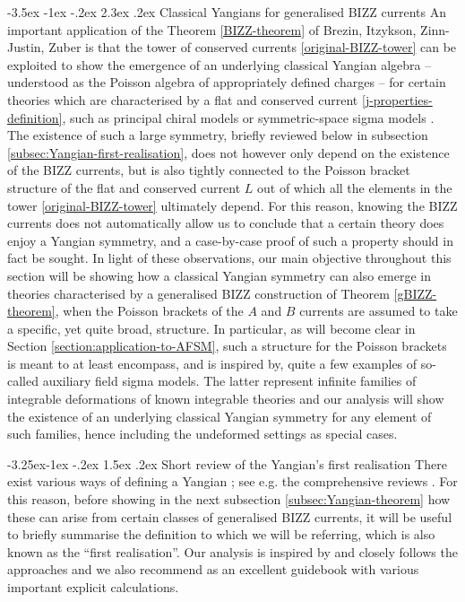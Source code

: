 \documentclass[12pt]{article}
\makeatletter
\renewcommand\section{\@startsection {section}{1}{\z@}%
                                   {-3.5ex \@plus -1ex \@minus -.2ex}%
                                   {2.3ex \@plus.2ex}%
                                   {\normalfont\large\bfseries}}
\renewcommand\subsection{\@startsection{subsection}{2}{\z@}%
                                     {-3.25ex\@plus -1ex \@minus -.2ex}%
                                     {1.5ex \@plus .2ex}%
                                     {\normalfont\bfseries}}
\numberwithin{equation}{section}
\makeatother
\begin{document}
\section{Classical Yangians for generalised BIZZ currents}\label{section:Yangians}
An important application of the Theorem \ref{BIZZ-theorem} of Brezin, Itzykson, Zinn-Justin, Zuber is that the tower of conserved currents \eqref{original-BIZZ-tower} can be exploited to show the emergence of an underlying classical Yangian algebra -- understood as the Poisson algebra of appropriately defined charges -- for certain theories which are characterised by a flat and conserved current \eqref{j-properties-definition}, such as principal chiral models \cite{MacKay:1992he} or symmetric-space sigma models \cite{Klose:2016qfv}. The existence of such a large symmetry, briefly reviewed below in subsection \ref{subsec:Yangian-first-realisation}, does not however only depend on the existence of the BIZZ currents, but is also tightly connected to the Poisson bracket structure of the flat and conserved current $L$ out of which all the elements in the tower \eqref{original-BIZZ-tower} ultimately depend. For this reason, knowing the BIZZ currents does not automatically allow us to conclude that a certain theory does enjoy a Yangian symmetry, and a case-by-case proof of such a property should in fact be sought. In light of these observations, our main objective throughout this section will be showing how a classical Yangian symmetry can also emerge in theories characterised by a generalised BIZZ construction of Theorem \ref{gBIZZ-theorem}, when the Poisson brackets of the $A$ and $B$ currents are assumed to take a specific, yet quite broad, structure. In particular, as will become clear in Section \ref{section:application-to-AFSM}, such a structure for the Poisson brackets is meant to at least encompass, and is inspired by, quite a few examples of so-called auxiliary field sigma models. The latter represent infinite families of integrable deformations of known integrable theories and our analysis will show the existence of an underlying classical Yangian symmetry for any element of such families, hence including the undeformed settings as special cases.



\subsection{Short review of the Yangian's first realisation}\label{subsec:Yangian-first-realisation}
There exist various ways of defining a Yangian \cite{Drinfeld:1985rx,Drinfeld:1986in,Drinfeld:1987sy}; see e.g. the comprehensive reviews \cite{Loebbert:2016cdm,MacKay:2004tc,Torrielli:2010kq,Torrielli:2011gg,Bernard:1992ya}. For this reason, before showing in the next subsection \ref{subsec:Yangian-theorem} how these can arise from certain classes of generalised BIZZ currents, it will be useful to briefly summarise the definition to which we will be referring, which is also known as the ``first realisation''. Our analysis is inspired by and closely follows the approaches \cite{MacKay:1992he,Klose:2016qfv} and we also recommend \cite{Itsios:2014vfa} as an excellent guidebook with various important explicit calculations. 
\end{document}

